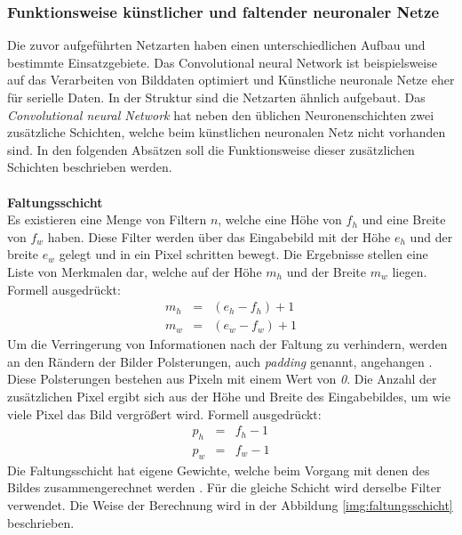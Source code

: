   \subsubsection{Funktionsweise künstlicher und faltender neuronaler Netze}\label{s.funktwknnundcnn}
Die zuvor aufgeführten Netzarten haben einen unterschiedlichen Aufbau und bestimmte Einsatzgebiete. Das Convolutional neural Network ist beispielsweise auf das Verarbeiten von Bilddaten optimiert und Künstliche neuronale Netze eher für serielle Daten. In der Struktur sind die Netzarten ähnlich aufgebaut. Das \textit{Convolutional neural Network} hat neben den üblichen Neuronenschichten zwei zusätzliche Schichten, welche beim künstlichen neuronalen Netz nicht vorhanden sind. In den folgenden Absätzen soll die Funktionsweise dieser zusätzlichen Schichten beschrieben werden.\\\\
\textbf{Faltungsschicht}\\
Es existieren eine Menge von Filtern $n$, welche eine Höhe von $f_{h}$ und eine Breite von $f_{w}$ haben. Diese Filter werden über das Eingabebild mit der Höhe $e_{h}$ und der breite $e_{w}$ gelegt und in ein Pixel schritten bewegt. Die Ergebnisse stellen eine Liste von Merkmalen dar, welche auf der Höhe $m_{h}$ und der Breite $m_{w}$ liegen. Formell ausgedrückt:
\begin{eqnarray} 
m_{h}&=&(e_{h} - f_{h})+1\\
m_{w}&=&(e_{w} - f_{w})+1
\end{eqnarray}
Um die Verringerung von Informationen nach der Faltung zu verhindern, werden an den Rändern der Bilder Polsterungen, auch \textit{padding} genannt, angehangen \cite[343]{goodfellow2016deep}. Diese Polsterungen bestehen aus Pixeln mit einem Wert von \textit{0}. Die Anzahl der zusätzlichen Pixel ergibt sich aus der Höhe und Breite des Eingabebildes, um wie viele Pixel das Bild vergrößert wird. Formell ausgedrückt:
\begin{eqnarray}
p_{h}&=&f_{h} - 1\\
p_{w}&=&f_{w} - 1
\end{eqnarray}
Die Faltungsschicht hat eigene Gewichte, welche beim Vorgang mit denen des Bildes zusammengerechnet werden \cite[331ff.]{goodfellow2016deep}. Für die gleiche Schicht wird derselbe Filter verwendet. Die Weise der Berechnung wird in der Abbildung \ref{img:faltungsschicht}  beschrieben.

